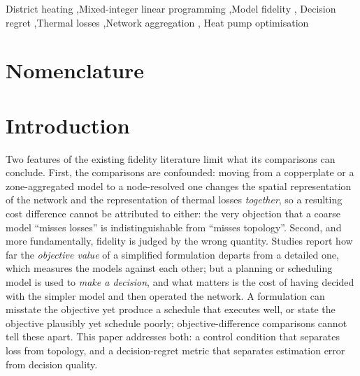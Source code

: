 \documentclass[a4paper,fleqn]{cas-sc}
\newif\ifmarkup \markupfalse          %
\newcommand{\new}[1]{\textcolor[HTML]{1A5FB4}{#1}}   %
\newcommand{\new}[1]{#1}
\begin{document}
\begin{keywords}
District heating \sep Mixed-integer linear programming \sep Model fidelity \sep
Decision regret \sep Thermal losses \sep Network aggregation \sep
Heat pump optimisation
\end{keywords}



\maketitle

\ifmarkup
\begin{center}\footnotesize\fbox{\parbox{0.9\linewidth}{%
\textbf{Marked-up copy.} \textcolor[HTML]{1A5FB4}{Blue} marks material new in this revision;
\textcolor[HTML]{0F7A5A}{green} marks text carried from the original submission and materially
rewritten; \textcolor[HTML]{9A9996}{grey} marks deletions we judged a reader would want flagged.
Unmarked text is unchanged. Because the manuscript was restructured and the model levels renamed,
marking is at paragraph rather than sentence granularity.}}
\end{center}
\fi


\section*{Nomenclature}
\new{}

\section{Introduction}
\label{sec:introduction}
\new{}

Two features of the existing fidelity literature limit what its comparisons can
conclude. First, the comparisons are confounded: moving from a copperplate or a
zone-aggregated model to a node-resolved one changes the spatial representation of the
network and the representation of thermal losses \emph{together}, so a resulting cost
difference cannot be attributed to either: the very objection that a coarse model
``misses losses'' is indistinguishable from ``misses topology''. Second, and more
fundamentally, fidelity is judged by the wrong quantity. Studies report how far the
\emph{objective value} of a simplified formulation departs from a detailed one, which
measures the models against each other; but a planning or scheduling model is used to
\emph{make a decision}, and what matters is the cost of having decided with the simpler
model and then operated the network. A formulation can misstate the objective yet
produce a schedule that executes well, or state the objective plausibly yet schedule
poorly; objective-difference comparisons cannot tell these apart. This paper addresses
both: a control condition that separates loss from topology, and a decision-regret
metric that separates estimation error from decision quality.
\end{document}
